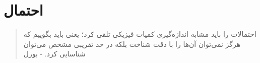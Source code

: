 \chapter{احتمال}
\thispagestyle{empty}

\begin{quote}
	{\lotus
		احتمالات را باید مشابه اندازه‌گیری کمیات فیزیکی تلقی کرد؛ یعنی باید بگوییم که هرگز نمی‌توان آن‌ها را با دقت شناخت بلکه در حد تقریبی مشخص می‌توان شناسایی کرد. \quad - بورل%
	}
\end{quote}
